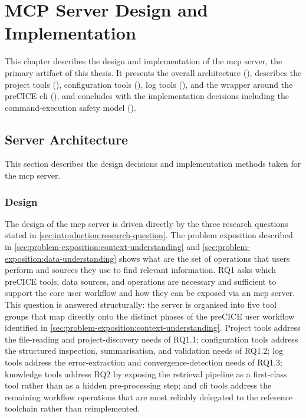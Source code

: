 \documentclass[
  numbers=noenddot,
  english,
  a4paper,
  twoside,
  bibliography=totoc,
  headsepline,
  cleardoublepage=empty,
  parskip=half,
  draft=false
]{scrbook}
\theoremstyle{break}
\renewcommand{\_}{\textunderscore\allowbreak}
\begin{document}
\chapter{MCP Server Design and Implementation}\label{sec:mcp-server}

This chapter describes the design and implementation of the \gls{mcp} server, the primary
artifact of this thesis. It presents the overall architecture (),
describes the project tools (), configuration tools
(), log tools (), and the
wrapper around the preCICE \gls{cli} (), and concludes with
the implementation decisions including the command-execution safety model
().


\section{Server Architecture}\label{sec:mcp-server:architecture}

This section describes the design decisions and implementation methods taken for the \gls{mcp} server.

\subsection*{Design}

The design of the \gls{mcp} server is driven directly by the three research questions stated
in \cref{sec:introduction:research-question}. The problem exposition described in 
\cref{sec:problem-exposition:context-understanding} and \cref{sec:problem-exposition:data-understanding}
shows what are the set of operations that users perform and sources they use to find relevant information.
RQ1 asks which preCICE tools, data sources, and
operations are necessary and sufficient to support the core user workflow and how they can be
exposed via an \gls{mcp} server. This question is answered structurally: the server is
organised into five tool groups that map directly onto the distinct phases of the preCICE user
workflow identified in \cref{sec:problem-exposition:context-understanding}. Project tools
address the file-reading and project-discovery needs of RQ1.1; configuration tools address the
structured inspection, summarisation, and validation needs of RQ1.2; log tools address the
error-extraction and convergence-detection needs of RQ1.3; knowledge tools address RQ2 by
exposing the retrieval pipeline as a first-class tool rather than as a hidden pre-processing
step; and \gls{cli} tools address the remaining workflow operations that are most reliably
delegated to the reference toolchain rather than reimplemented.
\end{document}
